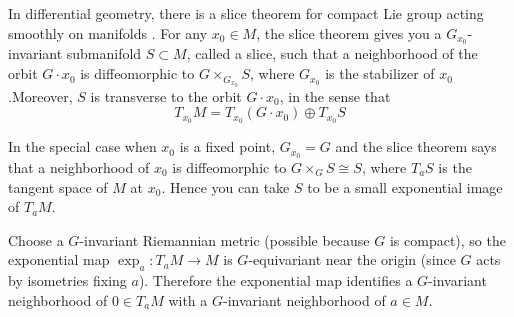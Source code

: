 \documentclass[12pt]{article}
\begin{document}
\begin{remark}
    In differential geometry, there is a slice theorem for compact Lie group acting smoothly on manifolds \cite{Palais}. For any $x_0 \in M$, the slice theorem gives you a $G_{x_0}$-invariant submanifold $S \subset M$, called a slice, such that a neighborhood of the orbit $G\cdot x_0$ is diffeomorphic to $G \times_{G_{x_0}} S$, where $G_{x_0}$ is the stabilizer of $x_0$.Moreover, $S$ is transverse to the orbit $G\cdot x_0$, in the sense that \[T_{x_0}M = T_{x_0}(G\cdot x_0) \oplus T_{x_0}S\]

In the special case when $x_0$ is a fixed point, $G_{x_0} = G$ and the slice theorem says that a neighborhood of $x_0$ is diffeomorphic to $G \times_G S \cong S$, where $T_aS$ is the tangent space of $M$ at $x_0$. Hence you can take $S$ to be a small exponential image of $T_aM$.

Choose a $G$-invariant Riemannian metric (possible because $G$ is compact), so the exponential map $\exp_a : T_aM \to M$ is $G$-equivariant near the origin (since $G$ acts by isometries fixing $a$). Therefore the exponential map identifies a $G$-invariant neighborhood of $0\in T_aM$
with a $G$-invariant neighborhood of $a\in M$.

\end{remark}
\end{document}

